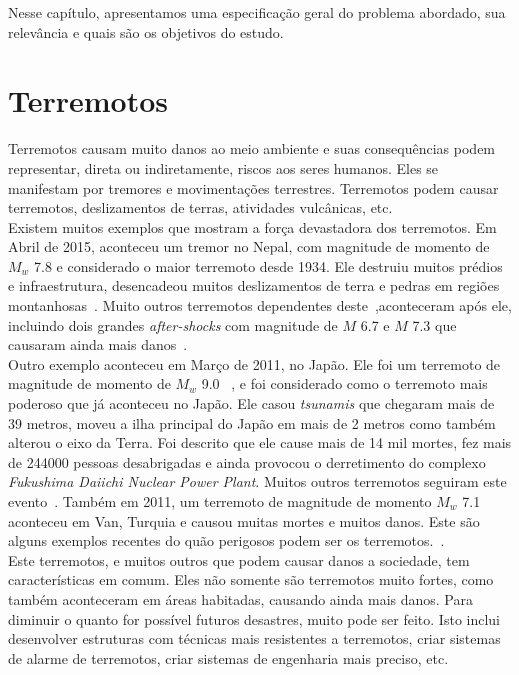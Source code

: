 Nesse capítulo, apresentamos uma especificação geral do problema abordado, sua relevância e quais são os objetivos do estudo.\\

\section{Terremotos}
Terremotos causam muito danos ao meio ambiente e suas consequências podem representar, direta ou indiretamente, riscos aos seres humanos. Eles se manifestam por tremores e movimentações terrestres. Terremotos podem causar terremotos, deslizamentos de terras, atividades vulcânicas, etc.\\

Existem muitos exemplos que mostram a força devastadora dos terremotos. Em Abril de 2015, aconteceu um tremor no Nepal, com magnitude de momento de $M_w$ 7.8 e considerado o maior terremoto desde 1934. Ele destruiu muitos prédios e infraestrutura, desencadeou muitos deslizamentos de terra e pedras em regiões montanhosas~\cite{wilkinson20152015}. Muito outros terremotos dependentes deste~\cite{van2012seismicity},aconteceram após ele, incluindo dois grandes \textit{after-shocks} com magnitude de $M$ 6.7 e $M$ 7.3 que causaram ainda mais danos~\cite{wilkinson20152015}.\\

Outro exemplo aconteceu em Março de 2011, no Japão. Ele foi um terremoto de magnitude de momento de $M_w$ 9.0 ~\cite{simons20112011}, e foi considerado como o terremoto mais poderoso que já aconteceu no Japão. Ele casou \textit{tsunamis} que chegaram mais de 39 metros, moveu a ilha principal do Japão em mais de 2 metros como também alterou o eixo da Terra. Foi descrito que ele cause mais de 14 mil mortes, fez mais de 244000 pessoas desabrigadas e ainda provocou o derretimento do complexo \textit{Fukushima Daiichi Nuclear Power Plant}. Muitos outros terremotos seguiram este evento~\cite{mimura2011damage}. Também em 2011, um terremoto de magnitude de momento $M_w$ 7.1 aconteceu em Van, Turquia e causou muitas mortes e muitos danos. Este são alguns exemplos recentes do quão perigosos podem ser os terremotos.~\cite{irmak2012source}.\\

Este terremotos, e muitos outros que podem causar danos a sociedade, tem características em comum. Eles não somente são terremotos muito fortes, como também aconteceram em áreas habitadas, causando ainda mais danos. Para diminuir o quanto for possível futuros desastres, muito pode ser feito. Isto inclui desenvolver estruturas com técnicas mais resistentes a terremotos, criar sistemas de alarme de terremotos, criar sistemas de engenharia mais preciso, etc.\\


